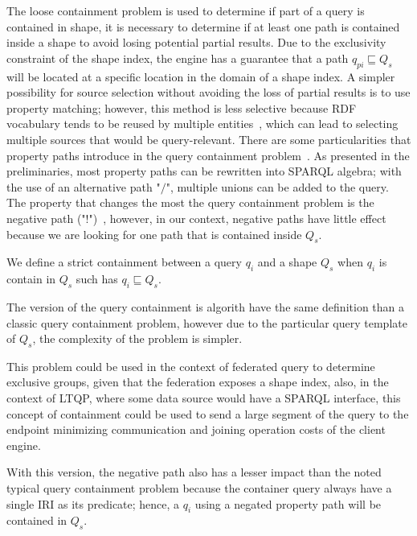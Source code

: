 The loose containment problem is used to determine if part of a query is contained in shape,
it is necessary to determine if at least one path is contained inside a shape to avoid losing potential partial results.
Due to the exclusivity constraint of the shape index, the engine has a guarantee that a path $q_{pi} \sqsubseteq Q_s$ will be located at a specific location in the domain of a shape index.
A simpler possibility for source selection without avoiding the loss of partial results is to use property matching;
however, this method is less selective because RDF vocabulary tends to be reused by multiple entities~\cite{Stuckenschmidt2004, Harth2010},
which can lead to selecting multiple sources that would be query-relevant.
There are some particularities that property paths introduce in the query containment problem~\cite{Kostylev2015}.
As presented in the preliminaries, most property paths can be rewritten into SPARQL algebra; with the use of an alternative path "$/$", multiple unions can be added to the query.
The property that changes the most the query containment problem is the negative path ("$!$")~\cite{Kostylev2015},
however, in our context, negative paths have little effect because we are looking for one path that is contained inside $Q_s$.

\iffalse
LET MAKE AN ALGORITHM and analyse the complexity
\fi


\begin{definition}\label{def:strictContainment}
We define a strict containment between a query $q_i$ and a shape $Q_s$ when $q_i$ is contain in $Q_s$ such has $q_{i} \sqsubseteq Q_s$.
\end{definition}

The version of the query containment is algorith have the same definition than a classic query containment problem, however due to the 
particular query template of $Q_s$, the complexity of the problem is simpler.

This problem could be used in the context of federated query to determine exclusive groups, given that the federation exposes a shape index, 
also, in the context of LTQP, where some data source would have a SPARQL interface, this concept of containment could be used to send a large segment of the query to the endpoint 
minimizing communication and joining operation costs of the client engine.

With this version, the negative path also has a lesser impact than the noted typical query containment problem because the container query 
always have a single IRI as its predicate; hence, a $q_i$ using a negated property path will be contained in $Q_s$.

